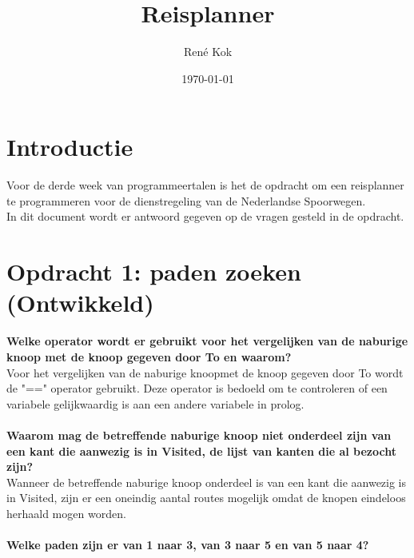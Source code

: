 \documentclass{uva-inf-article}
\title{Reisplanner}
\author{René Kok}
\date{\today}
\begin{document}
\maketitle




\section{Introductie}
Voor de derde week van programmeertalen is het de opdracht om een reisplanner te programmeren 
voor de dienstregeling van de Nederlandse Spoorwegen.\\
In dit document wordt er antwoord gegeven op de vragen gesteld in de opdracht.

\section{Opdracht 1: paden zoeken (Ontwikkeld)}
\textbf{Welke operator wordt er gebruikt voor het vergelijken van de naburige knoop met de knoop gegeven door To en waarom?}\\
Voor het vergelijken van de naburige knoopmet de knoop gegeven door To wordt de "==" operator gebruikt. 
Deze operator is bedoeld om te controleren of een variabele gelijkwaardig is aan een andere variabele in prolog.\\\\  
\textbf{Waarom mag de betreffende naburige knoop niet onderdeel zijn van een kant die aanwezig is in Visited, de lijst van kanten die al bezocht zijn?}\\
Wanneer de betreffende naburige knoop onderdeel is van een kant die aanwezig is in Visited, 
zijn er een oneindig aantal routes mogelijk omdat de knopen eindeloos herhaald mogen worden.\\\\
\textbf{Welke paden zijn er van 1 naar 3, van 3 naar 5 en van 5 naar 4?}
\end{document}
